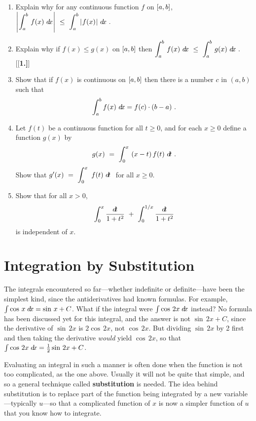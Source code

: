 {\begin{enumerate}[\bfseries 1.]
 \item Explain why for any continuous function $f$ on $\lbrack a,b \rbrack$,
  $\Biggl\lvert\mspace{1mu}\displaystyle\int_a^b\,f(x)~d\!x\mspace{1mu}\Biggr\rvert ~\le~ \displaystyle\int_a^b\,\lvert\mspace{1mu}f(x)\mspace{1mu}\rvert~d\!x ~.$
 \item Explain why if $f(x) \le g(x)$ on $\lbrack a,b \rbrack$ then
 $\displaystyle\int_a^b\,f(x)~d\!x ~\le~ \displaystyle\int_a^b\,g(x)~d\!x ~.$
[{[\bfseries 1.]}]
 \item Show that if $f(x)$ is continuous on $\lbrack a,b \rbrack$ then there is a number
  $c$ in $(a,b)$ such that
\[
\int_a^b f(x)~d\!x = f(c) \cdot (b-a) ~.
\]
 \item Let $f(t)$ be a continuous function for all $t \ge 0$, and for each
  $x \ge 0$ define a function $g(x)$ by
  \[
   g(x) ~=~ \displaystyle\int_0^x ~(x-t)\,f(t)~d\!t ~.
  \]
  Show that $g'(x) ~=~ \displaystyle\int_0^x ~f(t)~d\!t ~$ for all $x \ge 0$.
 \item Show that for all $x > 0$,
\[
\int_0^x \frac{d\!t}{1+t^2} ~+~ \int_0^{1/x} \frac{d\!t}{1+t^2}
\]
is independent of $x$.
\end{enumerate}
}
\newpage
\section{Integration by Substitution}\label{sec:int-by-sub}
The integrals encountered so far---whether indefinite or definite---have been
the simplest kind, since the antiderivatives had known formulas. For
example, $\int \cos\,x\;d\!x = \sin\,x + C$. What if the integral were
$\int \cos\,2x\;d\!x$ instead? No formula has been discussed yet for this
integral, and the answer is not $\sin\,2x + C$, since the derivative of
$\sin\,2x$ is $2 \cos\,2x$, not $\cos\,2x$. But dividing $\sin\,2x$ by 2 first
and then taking the derivative \emph{would} yield $\cos\,2x$, so that
$\int \cos\,2x\;d\!x = \frac{1}{2}\sin\,2x + C$.

Evaluating an integral in such a manner is often done when the function is not
too complicated, as the one above. Usually it will not be quite that simple, and
so a general technique called \textbf{substitution}
is needed. The idea behind substitution is to replace part of the function being
integrated by a new variable---typically $u$---so that a complicated function of
$x$ is now a simpler function of $u$ that you know how to integrate.

